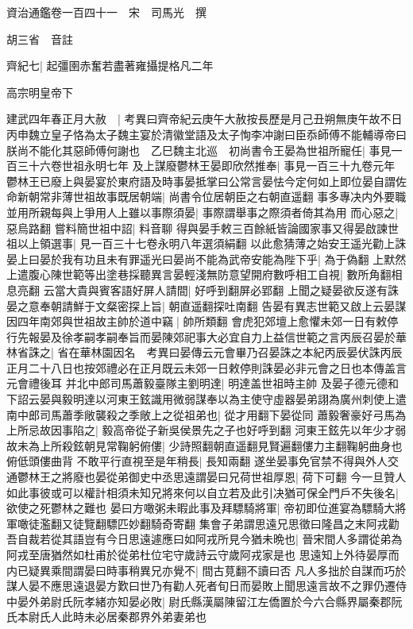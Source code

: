 資治通鑑卷一百四十一　宋　司馬光　撰

胡三省　音註

齊紀七|{
	起彊圉赤奮若盡著雍攝提格凡二年}


高宗明皇帝下

建武四年春正月大赦　|{
	考異曰齊帝紀云庚午大赦按長歷是月己丑朔無庚午故不日}
丙申魏立皇子恪為太子魏主宴於清徽堂語及太子恂李冲謝曰臣忝師傅不能輔導帝曰朕尚不能化其惡師傅何謝也　乙巳魏主北巡　初尚書令王晏為世祖所寵任|{
	事見一百三十六卷世祖永明七年}
及上謀廢鬱林王晏即欣然推奉|{
	事見一百三十九卷元年}
鬱林王已廢上與晏宴於東府語及時事晏抵掌曰公常言晏怯今定何如上即位晏自謂佐命新朝常非薄世祖故事既居朝端|{
	尚書令位居朝臣之右朝直遥翻}
事多專决内外要職並用所親每與上爭用人上雖以事際須晏|{
	事際謂舉事之際須者倚其為用}
而心惡之|{
	惡烏路翻}
嘗料簡世祖中詔|{
	料音聊}
得與晏手敕三百餘紙皆論國家事又得晏啟諫世祖以上領選事|{
	見一百三十七卷永明八年選須絹翻}
以此愈猜薄之始安王遥光勸上誅晏上曰晏於我有功且未有罪遥光曰晏尚不能為武帝安能為陛下乎|{
	為于偽翻}
上默然上遣腹心陳世範等出塗巷採聽異言晏輕淺無防意望開府數呼相工自視|{
	數所角翻相息亮翻}
云當大貴與賓客語好屏人請間|{
	好呼到翻屏必郢翻}
上聞之疑晏欲反遂有誅晏之意奉朝請鮮于文粲密探上旨|{
	朝直遥翻探吐南翻}
告晏有異志世範又啟上云晏謀因四年南郊與世祖故主帥於道中竊|{
	帥所類翻}
會虎犯郊壇上愈懼未郊一日有敕停行先報晏及徐孝嗣孝嗣奉旨而晏陳郊祀事大必宜自力上益信世範之言丙辰召晏於華林省誅之|{
	省在華林園因名　考異曰晏傳云元會畢乃召晏誅之本紀丙辰晏伏誅丙辰正月二十八日也按郊禮必在正月既云未郊一日敕停則誅晏必非元會之日也本傳盖言元會禮後耳}
并北中郎司馬蕭毅臺隊主劉明達|{
	明達盖世祖時主帥}
及晏子德元德和下詔云晏與毅明達以河東王鉉識用微弱謀奉以為主使守虛器晏弟詡為廣州刺使上遣南中郎司馬蕭季敞襲殺之季敞上之從祖弟也|{
	從才用翻下晏從同}
蕭毅奢豪好弓馬為上所忌故因事陷之|{
	毅高帝從子新吳侯景先之子也好呼到翻}
河東王鉉先以年少才弱故未為上所殺鉉朝見常鞠躬俯僂|{
	少詩照翻朝直遥翻見賢遍翻僂力主翻鞠躬曲身也俯低頭僂曲背}
不敢平行直視至是年稍長|{
	長知兩翻}
遂坐晏事免官禁不得與外人交通鬱林王之將廢也晏從弟御史中丞思遠謂晏曰兄荷世祖厚恩|{
	荷下可翻}
今一旦贊人如此事彼或可以權計相須未知兄將來何以自立若及此引决猶可保全門戶不失後名|{
	欲使之死鬱林之難也}
晏曰方噉粥未暇此事及拜驃騎將軍|{
	帝初即位進宴為驃騎大將軍噉徒濫翻又徒覽翻驃匹妙翻騎奇寄翻}
集會子弟謂思遠兄思徵曰隆昌之末阿戎勸吾自裁若從其語豈有今日思遠遽應曰如阿戎所見今猶未晩也|{
	晉宋間人多謂從弟為阿戎至唐猶然如杜甫於從弟杜位宅守歲詩云守歲阿戎家是也}
思遠知上外待晏厚而内已疑異乘間謂晏曰時事稍異兄亦覺不|{
	間古莧翻不讀曰否}
凡人多拙於自謀而巧於謀人晏不應思遠退晏方歎曰世乃有勸人死者旬日而晏敗上聞思遠言故不之罪仍遷侍中晏外弟尉氏阮孝緒亦知晏必敗|{
	尉氏縣漢屬陳留江左僑置於今六合縣界屬秦郡阮氏本尉氏人此時未必居秦郡界外弟妻弟也}
